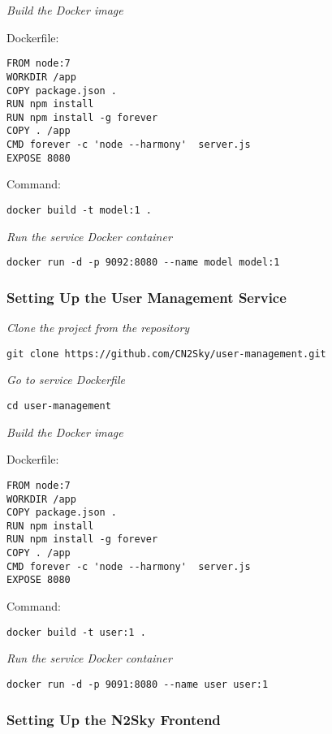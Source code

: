 \emph{Build the Docker image}

Dockerfile:
 \begin{lstlisting}
FROM node:7
WORKDIR /app
COPY package.json .
RUN npm install
RUN npm install -g forever
COPY . /app
CMD forever -c 'node --harmony'  server.js
EXPOSE 8080
\end{lstlisting}

Command: 

 \begin{lstlisting}
docker build -t model:1 .
\end{lstlisting}


\emph{Run the service Docker container}
 \begin{lstlisting}
docker run -d -p 9092:8080 --name model model:1
\end{lstlisting}



\subsubsection{Setting Up the User Management Service}\label{user setup}

\emph{Clone the project from the repository}
 \begin{lstlisting}
git clone https://github.com/CN2Sky/user-management.git
\end{lstlisting}

\emph{Go to service Dockerfile}
 \begin{lstlisting}
cd user-management
\end{lstlisting}

\emph{Build the Docker image}

Dockerfile:
 \begin{lstlisting}
FROM node:7
WORKDIR /app
COPY package.json .
RUN npm install
RUN npm install -g forever
COPY . /app
CMD forever -c 'node --harmony'  server.js
EXPOSE 8080
\end{lstlisting}

Command: 

 \begin{lstlisting}
docker build -t user:1 .
\end{lstlisting}


\emph{Run the service Docker container}
 \begin{lstlisting}
docker run -d -p 9091:8080 --name user user:1
\end{lstlisting}



\subsubsection{Setting Up the N2Sky Frontend}\label{frontend setup}

